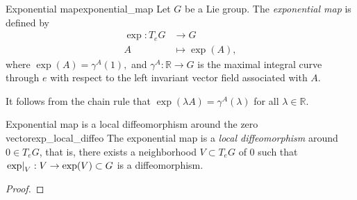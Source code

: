 \begin{definition}{Exponential map}{exponential_map}
    Let \(G\) be a Lie group. The \emph{exponential map} is defined by
    \begin{align*}
        \exp : T_eG &\to G\\
                  A &\mapsto \exp(A),
    \end{align*}
    where \(\exp(A) = \gamma^A(1),\) and \(\gamma^A : \mathbb{R} \to G\) is the maximal integral curve through \(e\) with respect to the left invariant vector field associated with \(A.\)
\end{definition}
\begin{remark}
    It follows from the chain rule that \(\exp(\lambda A) = \gamma^A(\lambda)\) for all \(\lambda \in \mathbb{R}\). 
\end{remark}


\begin{theorem}{Exponential map is a local diffeomorphism around the zero vector}{exp_local_diffeo}
    The exponential map is a \emph{local diffeomorphism} around \(0 \in T_eG\), that is, there exists a neighborhood \(V \subset T_eG\) of \(0\) such that \(\left.\exp\right\rvert_{V} : V \to \exp(V) \subset G\) is a diffeomorphism.
\end{theorem}
\begin{proof}
\end{proof}

